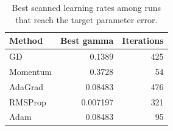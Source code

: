 \begin{table}[htbp]
    \centering
    \caption{Best scanned learning rates among runs that reach the target parameter error.}
    \label{tab:optimizer-learning-rates}
\begin{tabular}{lrr}
\hline\hline
Method & Best gamma & Iterations \\
\hline
GD & 0.1389 & 425 \\
Momentum & 0.3728 & 54 \\
AdaGrad & 0.08483 & 476 \\
RMSProp & 0.007197 & 321 \\
Adam & 0.08483 & 95 \\
\hline\hline
\end{tabular}
\end{table}
